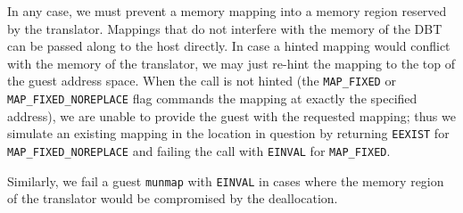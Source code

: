\begin{description}
	In any case, we must prevent a memory mapping into a memory region reserved by the translator.
	Mappings that do not interfere with the memory of the DBT can be passed along to the host directly.
	In case a hinted mapping would conflict with the memory of the translator, we may just re-hint the mapping to the top of the guest address space.
	When the call is not hinted (the \texttt{MAP\_FIXED} or \texttt{MAP\_FIXED\_NOREPLACE} flag commands the mapping at exactly the specified address), we are unable to provide the guest with the requested mapping;
	thus we simulate an existing mapping in the location in question by returning \texttt{EEXIST} for \texttt{MAP\_FIXED\_NOREPLACE} and failing the call with \texttt{EINVAL} for \texttt{MAP\_FIXED}.
	
	Similarly, we fail a guest \texttt{munmap} with \texttt{EINVAL} in cases where the memory region of the translator would be compromised by the deallocation.
\end{description}

